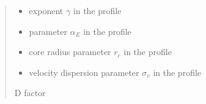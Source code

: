 \documentclass[letterpaper,10pt,english]{sphinxmanual}
\begin{document}
\begin{fulllineitems}
\begin{quote}
\begin{description}
\begin{itemize}
\item {} 
\sphinxAtStartPar
{} \textendash{} exponent \(\gamma\) in the {\hyperref[\detokenize{diffsph.profiles:diffsph.profiles.templates.hdz}]{}} profile

\item {} 
\sphinxAtStartPar
{} \textendash{} parameter \(\alpha_E\) in the {\hyperref[\detokenize{diffsph.profiles:diffsph.profiles.templates.enst}]{}} profile

\item {} 
\sphinxAtStartPar
{} \textendash{} core radius parameter \(r_c\) in the {\hyperref[\detokenize{diffsph.profiles:diffsph.profiles.templates.cnfw}]{}} profile

\item {} 
\sphinxAtStartPar
{} \textendash{} velocity dispersion parameter \(\sigma_v\) in the {\hyperref[\detokenize{diffsph.profiles:diffsph.profiles.templates.sis}]{}} profile

\end{itemize}

\sphinxAtStartPar
D factor

\end{description}\end{quote}

\end{fulllineitems}

\end{document}

